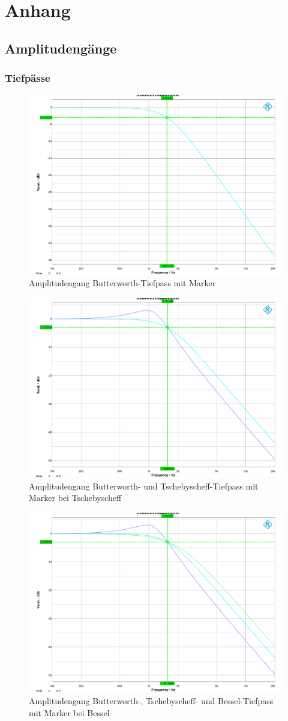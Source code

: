 \section{Anhang}
\subsection{Amplitudengänge}
\subsubsection{Tiefpässe}

\begin{figure}[h]
\centering
\includegraphics[width=0.60\linewidth]{Bilder/ImLabor/Amplitudengang_2_1_Butter_TP}
\caption{Amplitudengang Butterworth-Tiefpass mit Marker}
\label{fig:Amplitudengang_2_1_Butter_TP}
\end{figure}

\begin{figure}[h]
\centering
\includegraphics[width=0.60\linewidth]{Bilder/ImLabor/Amplitudengang_2_2_Tscheby_TP}
\caption{Amplitudengang Butterworth- und Tschebyscheff-Tiefpass mit Marker bei Tschebyscheff}
\label{fig:Amplitudengang_2_2_Tscheby_TP}
\end{figure}

\begin{figure}[h]
\centering
\includegraphics[width=0.60\linewidth]{Bilder/ImLabor/Amplitudengang_2_3_Bessel_TP_Alle}
\caption{Amplitudengang Butterworth-, Tschebyscheff- und Bessel-Tiefpass mit Marker bei Bessel}
\label{fig:Amplitudengang_2_3_Bessel_TP_Alle}
\end{figure}

